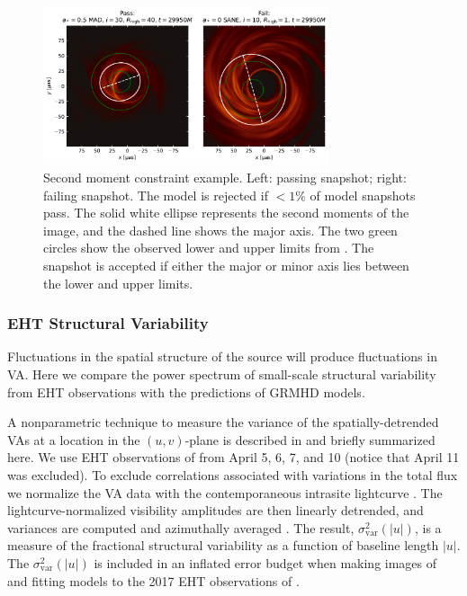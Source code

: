 \begin{figure}
  \centering
  \includegraphics[width=0.75\textwidth]{figures/passfail_sz.pdf}
  \caption{Second moment constraint example.  Left: passing snapshot; right: failing snapshot.  The model is rejected if $< 1\%$ of model snapshots pass. The solid white ellipse  represents the second moments of the image, and the dashed line shows the major axis.  The two green circles show the observed lower and upper limits from . The snapshot is accepted if either the major or minor axis lies between the lower and upper limits.
  }
  \label{fig:passfail_sz}
\end{figure}

\subsubsection{EHT Structural Variability}

Fluctuations in the spatial structure of the source will produce fluctuations in VA.  Here we compare  the power spectrum of small-scale structural variability from EHT observations with the predictions of GRMHD models.

A nonparametric technique to measure the variance of the spatially-detrended VAs at a location in the $(u,v)$-plane is described in \citet{NoiseModeling} and briefly summarized here.  We use EHT observations of \sgra from April 5, 6, 7, and 10 (notice that April 11 was excluded).  To exclude correlations associated with  variations in the total flux we normalize the VA data with the contemporaneous intrasite lightcurve \citep{Georgiev_2022}.  The lightcurve-normalized visibility amplitudes are then linearly detrended, and variances are computed and azimuthally averaged \citep{NoiseModeling}.  The result, $\sigma_\text{var}^2 (|u|)$, is a measure of the fractional structural variability as a function of baseline length $|u|$.  The $\sigma_\text{var}^2 (|u|)$ is included in an inflated error budget when making images of and fitting models to the 2017 EHT observations of \sgra {}.

